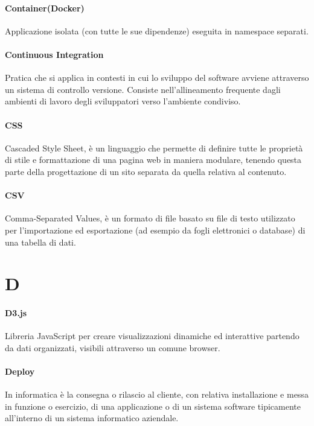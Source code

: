 \documentclass[]{article}
\begin{document}
	\paragraph*{Container(Docker)}
	Applicazione isolata (con tutte le sue dipendenze) eseguita in namespace separati.

	\paragraph*{Continuous Integration}
	Pratica che si applica in contesti in cui lo sviluppo del software avviene attraverso un sistema di controllo versione. Consiste nell'allineamento frequente dagli ambienti di lavoro degli sviluppatori verso l'ambiente condiviso.

	\paragraph*{CSS}
	Cascaded Style Sheet, è un linguaggio che permette di definire tutte le proprietà di stile e formattazione di una pagina web in maniera modulare, tenendo questa parte della progettazione di un sito separata da quella relativa al contenuto.

	\paragraph*{CSV}
	Comma-Separated Values, è un formato di file basato su file di testo utilizzato per l'importazione ed esportazione (ad esempio da fogli elettronici o database) di una tabella di dati.

	\newpage

	\section*{D}

	\paragraph*{D3.js}
	Libreria JavaScript per creare visualizzazioni dinamiche ed interattive partendo da dati organizzati, visibili attraverso un comune browser.

	\paragraph*{Deploy}
	In informatica è la consegna o rilascio al cliente, con relativa installazione e messa in funzione o esercizio, di una applicazione o di un sistema software tipicamente all’interno di un sistema informatico aziendale.
\end{document}
